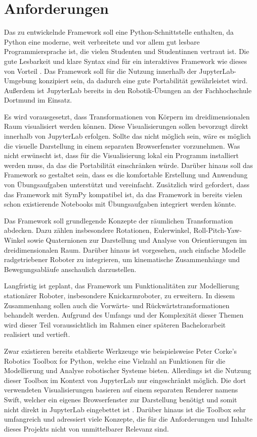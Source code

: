 \section{Anforderungen}
Das zu entwickelnde Framework soll eine Python-Schnittstelle enthalten,
da Python eine moderne, weit verbreitete und vor allem gut lesbare Programmiersprache ist, die vielen Studenten und Studentinnen vertraut ist.
Die gute Lesbarkeit und klare Syntax sind für ein interaktives Framework wie dieses von Vorteil \cite{python3_das_umfassende_handbuch}. 
Das Framework soll für die Nutzung innerhalb der JupyterLab-Umgebung konzipiert sein, da dadurch eine gute Portabilität gewährleistet wird.
Außerdem ist JupyterLab bereits in den Robotik-Übungen an der Fachhochschule Dortmund im Einsatz.

Es wird vorausgesetzt, dass Transformationen von Körpern im dreidimensionalen Raum visualisiert werden können.
Diese Visualisierungen sollen bevorzugt direkt innerhalb von JupyterLab erfolgen.
Sollte das nicht möglich sein, wäre es möglich die visuelle Darstellung in einem separaten Browserfenster vorzunehmen.
Was nicht erwünscht ist, dass für die Visualisierung lokal ein Programm installiert werden muss, da das die Portabilität einschränken würde.
Darüber hinaus soll das Framework so gestaltet sein, dass es die komfortable Erstellung und Anwendung von Übungsaufgaben unterstützt und vereinfacht.
Zusätzlich wird gefordert, dass das Framework mit SymPy kompatibel ist, da das Framework in bereits vielen schon existierende
Notebooks mit Übungsaufgaben integriert werden könnte.


Das Framework soll grundlegende Konzepte der räumlichen Transformation abdecken.
Dazu zählen insbesondere Rotationen, Eulerwinkel, Roll-Pitch-Yaw-Winkel sowie Quaternionen zur Darstellung und Analyse von Orientierungen im dreidimensionalen Raum.
Darüber hinaus ist vorgesehen, auch einfache Modelle radgetriebener Roboter zu integrieren, um kinematische Zusammenhänge und Bewegungsabläufe anschaulich darzustellen.

Langfristig ist geplant, das Framework um Funktionalitäten zur Modellierung stationärer Roboter, insbesondere Knickarmroboter, zu erweitern.
In diesem Zusammenhang sollen auch die Vorwärts- und Rückwärtstransformationen behandelt werden.
Aufgrund des Umfangs und der Komplexität dieser Themen wird dieser Teil voraussichtlich im Rahmen einer späteren Bachelorarbeit realisiert und vertieft.


Zwar existieren bereits etablierte Werkzeuge wie beispielsweise Peter Corke’s Robotics Toolbox for Python, welche eine Vielzahl an Funktionen für die Modellierung und Analyse robotischer Systeme bieten.
Allerdings ist die Nutzung dieser Toolbox im Kontext von JupyterLab nur eingeschränkt möglich.
Die dort verwendeten Visualisierungen basieren auf einem separaten Renderer namens Swift,
welcher ein eigenes Browserfenster zur Darstellung benötigt und somit nicht direkt in JupyterLab eingebettet ist \cite[77]{Robotics_Vision_and_Control}.
Darüber hinaus ist die Toolbox sehr umfangreich und adressiert viele Konzepte, die für die Anforderungen und Inhalte dieses Projekts nicht von unmittelbarer Relevanz sind.


